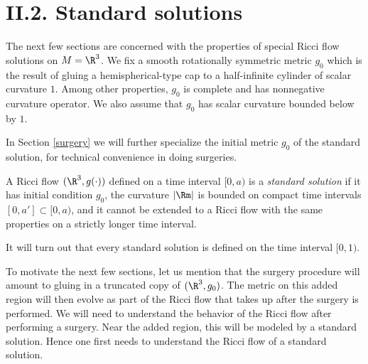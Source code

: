 \section{II.2. Standard solutions} \label{II.2}



The next few sections are concerned with the properties of  special
Ricci flow solutions on $M=\R^3$.
We fix a smooth rotationally symmetric   metric $g_0$ which
is the result of gluing a hemispherical-type cap to a
half-infinite cylinder of scalar curvature $1$.
Among other properties, $g_0$ is complete and has
nonnegative  curvature operator.
We also assume that $g_0$ has scalar curvature
bounded below by $1$.

\begin{remark}
  \label{rem:kl-standard-solutions-structural-remark-standard-solutions}

In Section \ref{surgery} we will further specialize the initial metric
$g_0$ of the standard solution, for technical convenience in
doing surgeries.
\end{remark}

\begin{definition}
  \label{def:kl-standard-solutions-standard-solution-definition}

\label{defstandardsolution}
A Ricci flow $(\R^3,g(\cdot))$  defined on a time interval $[0,a)$
is a {\em standard solution} if
it has  initial condition $g_0$, the curvature $|\Rm|$ is bounded
on compact time intervals $[0,a']\subset [0,a)$, and it cannot
be extended to a Ricci flow with the same properties
on a strictly longer time interval.
\end{definition}

It will turn out that every standard solution
is defined on the time interval $[0,1)$.

To motivate the next few sections, let us mention that the surgery
procedure will amount to gluing in a truncated copy of
$(\R^3, g_0)$. The metric on this added region will then evolve as
part of the Ricci flow that takes up after the surgery is performed.
We will need to understand
the behavior of the Ricci flow after performing a surgery. Near
the added region, this will be modeled by a standard solution.
Hence one first needs to understand the Ricci flow of a standard
solution.

